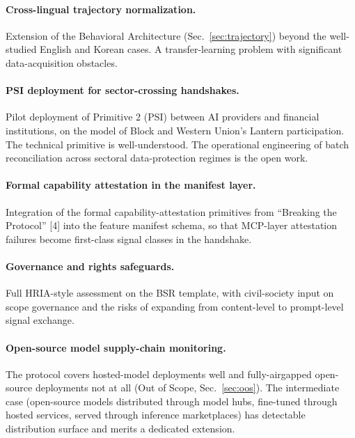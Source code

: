 \documentclass[11pt]{article}
\begin{document}
\paragraph{Cross-lingual trajectory normalization.} Extension of the Behavioral Architecture (Sec.~\ref{sec:trajectory}) beyond the well-studied English and Korean cases. A transfer-learning problem with significant data-acquisition obstacles.

\paragraph{PSI deployment for sector-crossing handshakes.} Pilot deployment of Primitive 2 (PSI) between AI providers and financial institutions, on the model of Block and Western Union's Lantern participation. The technical primitive is well-understood. The operational engineering of batch reconciliation across sectoral data-protection regimes is the open work.

\paragraph{Formal capability attestation in the manifest layer.} Integration of the formal capability-attestation primitives from ``Breaking the Protocol'' [4] into the feature manifest schema, so that MCP-layer attestation failures become first-class signal classes in the handshake.

\paragraph{Governance and rights safeguards.} Full HRIA-style assessment on the BSR template, with civil-society input on scope governance and the risks of expanding from content-level to prompt-level signal exchange.

\paragraph{Open-source model supply-chain monitoring.} The protocol covers hosted-model deployments well and fully-airgapped open-source deployments not at all (Out of Scope, Sec.~\ref{sec:oos}). The intermediate case (open-source models distributed through model hubs, fine-tuned through hosted services, served through inference marketplaces) has detectable distribution surface and merits a dedicated extension.

\end{document}
